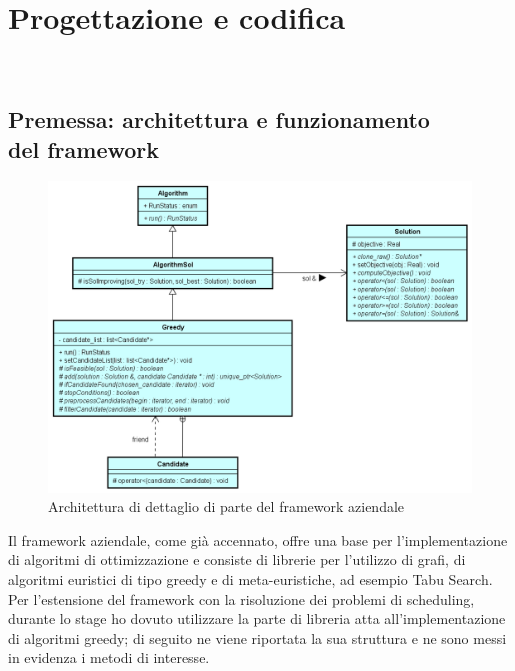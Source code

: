 
\chapter{Progettazione e codifica}
\label{cap:progettazione-codifica}

\\

\section{Premessa: architettura e funzionamento \\ del framework}
\begin{figure}[!h]
    \begin{widepage}
        \includegraphics[width=14.9cm,keepaspectratio]{../immagini/progettazione/framework.png}
        \caption{Architettura di dettaglio di parte del framework aziendale}
    \end{widepage}
\end{figure}
Il framework aziendale, come già accennato, offre una base per l'implementazione di algoritmi di ottimizzazione e consiste di librerie per l'utilizzo di grafi, di algoritmi euristici di tipo greedy e di meta-euristiche, ad esempio Tabu Search. 
Per l'estensione del framework con la risoluzione dei problemi di scheduling, durante lo stage ho dovuto utilizzare la parte di libreria atta all'implementazione di algoritmi greedy; di seguito ne viene riportata la sua struttura e ne sono messi in evidenza i metodi di interesse.
